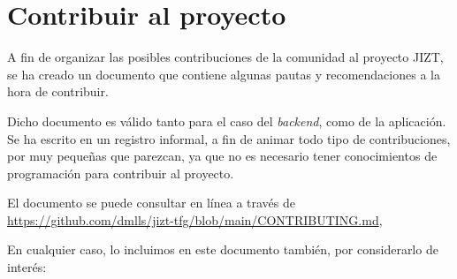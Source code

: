 \section{Contribuir al proyecto}

A fin de organizar las posibles contribuciones de la comunidad al proyecto JIZT, se ha creado un documento que contiene algunas pautas y recomendaciones a la hora de contribuir.

Dicho documento es válido tanto para el caso del \emph{backend}, como de la aplicación. Se ha escrito en un registro informal, a fin de animar todo tipo de contribuciones, por muy pequeñas que parezcan, ya que no es necesario tener conocimientos de programación para contribuir al proyecto.

El documento se puede consultar en línea a través de \href{https://github.com/dmlls/jizt-tfg/blob/main/CONTRIBUTING.md}{https://github.com/\newline dmlls/jizt-tfg/blob/main/CONTRIBUTING.md},

En cualquier caso, lo incluimos en este documento también, por considerarlo de interés:

